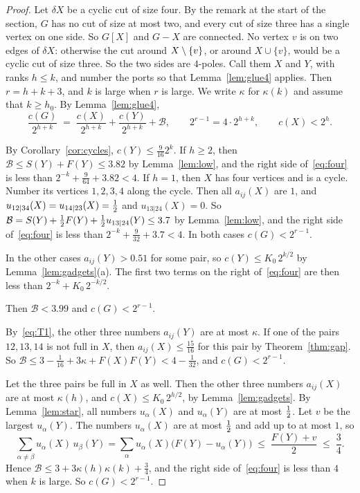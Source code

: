 \begin{proof}
Let $\delta X$ be a cyclic cut of size four. By the remark at the start of the section, $G$ has no
cut of size at most two, and every cut of size three has a single vertex on one side. So $G[X]$
and $G-X$ are connected. No vertex $v$ is on two edges of $\delta X$: otherwise the cut around
$X\setminus\{v\}$, or around $X\cup\{v\}$, would be a cyclic cut of size three. So the two sides are
$4$-poles. Call them $X$ and $Y$, with ranks $h\le k$, and number the ports so that
Lemma~\ref{lem:glue4} applies. Then $r=h+k+3$, and $k$ is large when $r$ is large. We write
$\kappa$ for $\kappa(k)$ and assume that $k\ge h_0$. By Lemma~\ref{lem:glue4},
\begin{equation}\label{eq:four}
  \frac{c(G)}{2^{h+k}}\;=\;\frac{c(X)}{2^{h+k}}+\frac{c(Y)}{2^{h+k}}+\mathcal B,
  \qquad 2^{r-1}=4\cdot2^{h+k},\qquad c(X)<2^{h}.
\end{equation}

 By Corollary~\ref{cor:cycles},
$c(Y)\le\frac9{16}2^{k}$. If $h\ge2$, then $\mathcal B\le S(Y)+F(Y)\le3.82$ by
Lemma~\ref{lem:low}, and the right side of~\eqref{eq:four} is less than
$2^{-k}+\frac9{64}+3.82<4$. If $h=1$, then $X$ has four vertices and is a cycle. Number its
vertices $1,2,3,4$ along the cycle. Then all $a_{ij}(X)$ are $1$, and
$u_{12|34}(X)=u_{14|23}(X)=\tfrac12$ and $u_{13|24}(X)=0$. So
$\mathcal B=S(Y)+\tfrac12 F(Y)+\tfrac12 u_{13|24}(Y)\le3.7$ by Lemma~\ref{lem:low}, and the right side
of~\eqref{eq:four} is less than $2^{-k}+\frac9{32}+3.7<4$. In both cases $c(G)<2^{r-1}$.

In the other cases $a_{ij}(Y)>0.51$ for some pair, so $c(Y)\le K_0\,2^{k/2}$ by
Lemma~\ref{lem:gadgets}(a). The first two terms on the right of~\eqref{eq:four} are then less
than $2^{-k}+K_0\,2^{-k/2}$.

 Then $\mathcal B<3.99$ and $c(G)<2^{r-1}$.

 By~\eqref{eq:T1}, the
other three numbers $a_{ij}(Y)$ are at most $\kappa$. If one of the pairs $12,13,14$ is not full
in $X$, then $a_{ij}(X)\le\frac{15}{16}$ for this pair by Theorem~\ref{thm:gap}. So
$\mathcal B\le3-\frac1{16}+3\kappa+F(X)F(Y)<4-\frac1{32}$, and $c(G)<2^{r-1}$.

Let the three pairs be full in $X$ as well. Then the other three numbers $a_{ij}(X)$ are at most
$\kappa(h)$, and $c(X)\le K_0\,2^{h/2}$, by Lemma~\ref{lem:gadgets}. By Lemma~\ref{lem:star}, all
numbers $u_\alpha(X)$ and $u_\alpha(Y)$ are at most $\tfrac12$. Let $v$ be the largest $u_\alpha(Y)$.
The numbers $u_\alpha(X)$ are at most $\tfrac12$ and add up to at most $1$, so
\[
  \sum_{\alpha\ne\beta}u_\alpha(X)\,u_\beta(Y)=\sum_\alpha u_\alpha(X)\bigl(F(Y)-u_\alpha(Y)\bigr)
  \;\le\;\frac{F(Y)+v}2\;\le\;\frac34 .
\]
Hence $\mathcal B\le3+3\kappa(h)\kappa(k)+\frac34$, and the right side of~\eqref{eq:four} is less
than $4$ when $k$ is large. So $c(G)<2^{r-1}$.


\end{proof}
